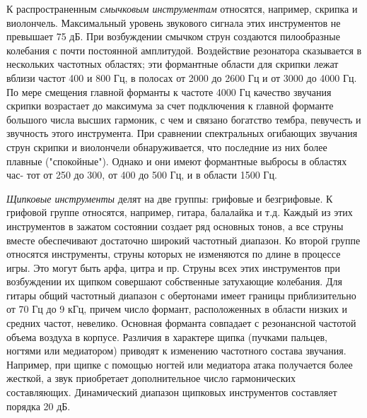 \documentclass[oneside, final, 14pt]{extreport}
\begin{document}
К распространенным {\itshape смычковым инструментам} относятся, например, скрипка и виолончель. Максимальный уровень звукового сигнала этих инструментов не превышает 75 дБ. При возбуждении смычком струн создаются пилообразные колебания с почти постоянной амплитудой. Воздействие резонатора
сказывается в нескольких частотных областях; эти формантные области для скрипки лежат вблизи частот 400 и 800 Гц, в полосах от 2000 до 2600 Гц и от 3000 до 4000 Гц. По мере смещения главной форманты к частоте 4000 Гц качество звучания скрипки возрастает до максимума за счет подключения к главной форманте большого числа высших гармоник, с чем и связано богатство тембра, певучесть и звучность этого инструмента. При сравнении спектральных огибающих звучания струн скрипки и виолончели обнаруживается, что последние из них более плавные ("спокойные"). Однако и они имеют формантные выбросы в областях час-
тот от 250 до 300, от 400 до 500 Гц, и в области 1500 Гц.

{\itshape Щипковые инструменты} делят на две группы: грифовые и безгрифовые. К грифовой группе относятся, например, гитара, балалайка и т.д. Каждый из этих инструментов в зажатом состоянии создает ряд основных тонов, а все струны вместе обеспечивают достаточно широкий частотный диапазон. Ко второй группе относятся инструменты, струны которых не изменяются по длине в процессе игры. Это могут быть арфа, цитра и пр. Струны всех этих инструментов при возбуждении их щипком совершают собственные затухающие колебания. Для гитары общий частотный диапазон с обертонами имеет границы приблизительно от 70 Гц до 9 кГц, причем число формант, расположенных в области низких и средних частот, невелико. Основная форманта совпадает с резонансной частотой объема воздуха в корпусе. Различия в характере щипка (пучками пальцев, ногтями или медиатором) приводят к изменению частотного состава звучания. Например, при щипке с помощью ногтей или медиатора атака получается более жесткой, а звук приобретает дополнительное число гармонических составляющих. Динамический диапазон щипковых инструментов составляет порядка 20 дБ.
\end{document}

